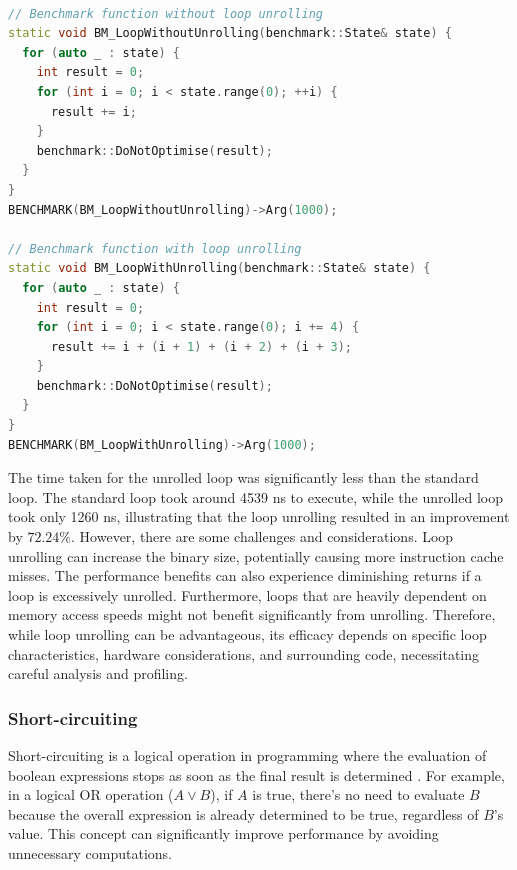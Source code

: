 \documentclass{article}
\theoremstyle{break}
\begin{document}
\begin{lstlisting}[style=customc++, language=C++, caption={Loop unrolling Google Benchmark}]

// Benchmark function without loop unrolling
static void BM_LoopWithoutUnrolling(benchmark::State& state) {
  for (auto _ : state) {
    int result = 0;
    for (int i = 0; i < state.range(0); ++i) {
      result += i;
    }
    benchmark::DoNotOptimise(result);
  }
}
BENCHMARK(BM_LoopWithoutUnrolling)->Arg(1000);

// Benchmark function with loop unrolling
static void BM_LoopWithUnrolling(benchmark::State& state) {
  for (auto _ : state) {
    int result = 0;
    for (int i = 0; i < state.range(0); i += 4) {
      result += i + (i + 1) + (i + 2) + (i + 3);
    }
    benchmark::DoNotOptimise(result);
  }
}
BENCHMARK(BM_LoopWithUnrolling)->Arg(1000);

\end{lstlisting}


The time taken for the unrolled loop was significantly less than the standard loop. The standard loop took around 4539 ns to execute, while the unrolled loop took only 1260 ns, illustrating that the loop unrolling resulted in an improvement by \(72.24\%\). However, there are some challenges and considerations. Loop unrolling can increase the binary size, potentially causing more instruction cache misses. The performance benefits can also experience diminishing returns if a loop is excessively unrolled. Furthermore, loops that are heavily dependent on memory access speeds might not benefit significantly from unrolling. Therefore, while loop unrolling can be advantageous, its efficacy depends on specific loop characteristics, hardware considerations, and surrounding code, necessitating careful analysis and profiling.



\subsubsection*{Short-circuiting}
Short-circuiting is a logical operation in programming where the evaluation of boo\-lean expressions stops as soon as the final result is determined \cite{14}. For example, in a logical OR operation (\( A \lor B \)), if \( A \) is true, there's no need to evaluate \( B \) because the overall expression is already determined to be true, regardless of \( B \)'s value. This concept can significantly improve performance by avoiding unnecessary computations.
\end{document}
